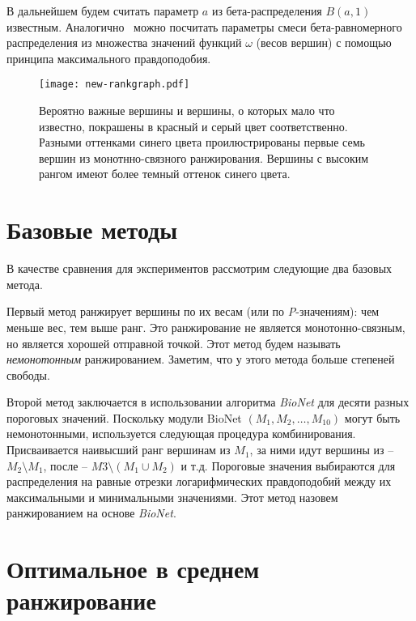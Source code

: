 В дальнейшем будем считать параметр $a$ из бета-распределения $B(a, 1)$
известным. Аналогично~\cite{Dittrich2008a} можно посчитать параметры смеси
бета-равномерного распределения из множества значений функций $\omega$ (весов
вершин) с помощью принципа максимального правдоподобия.

\begin{figure}
    \centering
    \texttt{[image: new-rankgraph.pdf]}
    \caption{
        Вероятно важные вершины и вершины, о которых мало что известно, покрашены
        в красный и серый цвет соответственно.  Разными оттенками синего цвета
        проилюстрированы первые семь вершин из монотнно-связного ранжирования.
        Вершины с высоким рангом имеют более темный оттенок синего цвета.
    }%
    \label{fig:rankgraph}%
\end{figure}





\section{Базовые методы}
\label{sec_baseline}

В качестве сравнения для экспериментов рассмотрим следующие два базовых метода.

Первый метод ранжирует вершины по их весам (или по \emph{P}-значениям): чем
меньше вес, тем выше ранг.  Это ранжирование не является монотонно-связным, но
является хорошей отправной точкой.  Этот метод будем называть
\emph{немонотонным} ранжированием.  Заметим, что у этого метода больше степеней
свободы.

Второй метод заключается в использовании алгоритма \emph{BioNet} для десяти
разных пороговых значений.  Поскольку модули BioNet $(M_1, M_2, \ldots,
M_{10})$ могут быть немонотонными, используется следующая процедура
комбинирования.  Присваивается наивысший ранг вершинам из $M_1$, за ними идут
вершины из -- $M_2 \setminus M_1$, после -- $M3 \setminus (M_1 \cup M_2)$
и т.д. Пороговые значения выбираются для распределения на равные отрезки
логарифмических правдоподобий между их максимальными и минимальными значениями.
Этот метод назовем ранжированием на основе \emph{BioNet}.





\section{Оптимальное в среднем ранжирование}
\label{sec_optimal}

